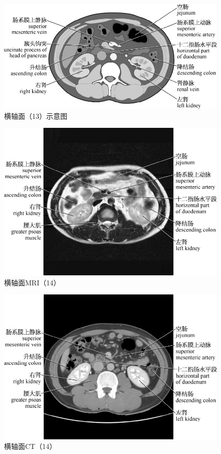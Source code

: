 \begin{figure}[!htbp]
 \centering
 \includegraphics{./images/Image00040.jpg}
 \captionsetup{justification=centering}
 \caption{横轴面（13）示意图}
  \end{figure} 
 \FloatBarrier

\begin{figure}[!htbp]
 \centering
 \includegraphics{./images/Image00041.jpg}
 \captionsetup{justification=centering}
 \caption{横轴面MRI（14）}
  \end{figure} 
 \FloatBarrier

\begin{figure}[!htbp]
 \centering
 \includegraphics{./images/Image00042.jpg}
 \captionsetup{justification=centering}
 \caption{横轴面CT（14）}
  \end{figure} 
 \FloatBarrier


